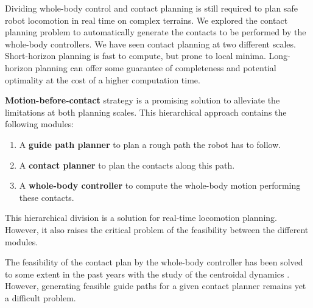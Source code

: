 Dividing whole-body control and contact planning is still required to plan safe robot locomotion in real time on complex terrains.
We explored the contact planning problem to automatically generate the contacts to be performed by the whole-body controllers.
We have seen contact planning at two different scales.
Short-horizon planning is fast to compute, but prone to local minima.
Long-horizon planning can offer some guarantee of completeness and potential optimality at the cost of a higher computation time.

\textbf{Motion-before-contact} strategy is a promising solution to alleviate the limitations at both planning scales. 
This hierarchical approach contains the following modules:
\begin{enumerate}
    \item A \textbf{guide path planner} to plan a rough path the robot has to follow.
    \item A \textbf{contact planner} to plan the contacts along this path.
    \item A \textbf{whole-body controller} to compute the whole-body motion performing these contacts.
\end{enumerate}
This hierarchical division is a solution for real-time locomotion planning.
However, it also raises the critical problem of the feasibility between the different modules.

The feasibility of the contact plan by the whole-body controller has been solved to some extent in the past years with the study of the centroidal dynamics \cite{prete_static_equilibrium_2016, CROC}.
However, generating feasible guide paths for a given contact planner remains yet a difficult problem. %


